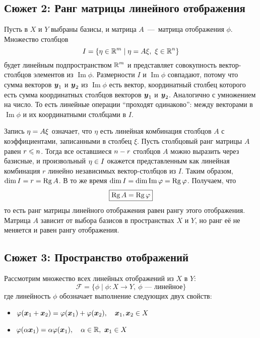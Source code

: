\documentclass[a4paper,12pt]{article}
\DeclareMathOperator{\Imag}{Im}
\begin{document}
  
  \subsection{Сюжет 2: Ранг матрицы линейного отображения}
  
  Пусть в $X$ и $Y$ выбраны базисы, и матрица $A$~---~матрица отображения $\phi$.
  Множество столбцов
  \[
    I = \{\eta \in \operatorname{\mathbb R}^m \mid \eta = A \xi,\ \xi \in \operatorname{\mathbb R}^n\}
  \]
  будет линейным подпространством $\operatorname{\mathbb R}^m$ и представляет совокупность вектор-столбцов элементов из $\Imag \phi$.
  Размерности $I$ и $\Imag \phi$ совпадают, потому что сумма векторов $\boldsymbol y_1$ и $\boldsymbol y_2$ из $\Imag \phi$ есть вектор, координатный столбец которого есть сумма координатных столбцов векторов $\boldsymbol y_1$ и $\boldsymbol y_2$.
  Аналогично с умножением на число.
  То есть линейные операции ``проходят одинаково'': между векторами в $\Imag \phi$ и их координатными столбцами в $I$.
  
  Запись $\eta \hm= A \xi$ означает, что $\eta$ есть линейная комбинация столбцов $A$ с коэффициентами, записанными в столбец $\xi$.
  Пусть столбцовый ранг матрицы $A$ равен $r \hm\leq n$.
  Тогда все оставшиеся $n \hm- r$ столбцов $A$ можно выразить через базисные, и произвольный $\eta \hm\in I$ окажется представленным как линейная комбинация $r$ линейно независимых вектор-столбцов из $I$.
  Таким образом, $\dim I \hm= r \hm= \Rg A$.
  В то же время $\dim I \hm= \dim \Imag\phi \hm= \Rg \phi$.
  Получаем, что
  \[
    \boxed{\operatorname{Rg} A = \operatorname{Rg} \varphi}
  \]
  то есть ранг матрицы линейного отображения равен рангу этого отображения.
  Матрица $A$ зависит от выбора базисов в пространствах $X$ и $Y$, но ранг её не меняется и равен рангу отображения.

  
  \subsection{Сюжет 3: Пространство отображений}
  \label{sec:plot2}
  
  Рассмотрим множество всех линейных отображений из $X$ в $Y$:
  \[
    \mathcal F = \{\phi \mid \phi\colon X \to Y,\ \phi\mbox{~---~линейное}\}
  \]
  где линейность $\phi$ обозначает выполнение следующих двух свойств:
  \begin{itemize}
    \item $\varphi(\boldsymbol x_1 + \boldsymbol x_2) = \varphi(\boldsymbol x_1) + \varphi(\boldsymbol x_2),\quad \boldsymbol x_1, \boldsymbol x_2 \in X$
    \item $\varphi(\alpha \boldsymbol x_1) = \alpha \varphi(\boldsymbol x_1),\quad \alpha \in \operatorname{\mathbb R},\ \boldsymbol x_1 \in X$
  \end{itemize}
  
\end{document}
